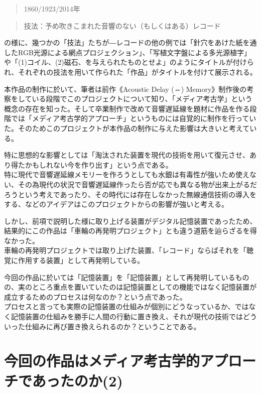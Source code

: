 \documentclass[a4paper,report]{jsbook}
\begin{document}
\begin{quote}
1860/1923/2014年
\end{quote}

\begin{quote}
技法：予め吹きこまれた音響のない（もしくはある）レコード
\end{quote}

の様に、幾つかの「技法」たちが―レコードの他の例では「針穴をあけた紙を通したRGB光源による網点プロジェクション」、「写植文字盤による多光源植字」や「(1)コイル、(2)磁石、を与えられたものとせよ」のようにタイトルが付けられ、それぞれの技法を用いて作られた「作品」がタイトルを付けて展示される。

本作品の制作に於いて、筆者は前作《Acoustic Delay (⇔)
Memory》制作後の考察をしている段階でこのプロジェクトについて知り、「メディア考古学」という概念の存在を知った。そして卒業制作で改めて音響遅延線を題材に作品を作る段階では「メディア考古学的アプローチ」というものには自覚的に制作を行っていた。そのためこのプロジェクトが本作品の制作に与えた影響は大きいと考えている。

特に思想的な影響としては「淘汰された装置を現代の技術を用いて復元させ、あり得たかもしれない今を作り出す」という点である。\\
特に現代で音響遅延線メモリーを作ろうとしても水銀は有毒性が強いため使えない、その為現代の状況で音響遅延線作ったら否が応でも異なる物が出来上がるだろうという考えであったり、その時代には存在しなかった無線通信技術の導入をする、などのアイデアはこのプロジェクトからの影響が強いと考える。

しかし、前項で説明した様に取り上げる装置がデジタル記憶装置であったため、結果的にこの作品は「車輪の再発明プロジェクト」とも違う道筋を辿らざるを得なかった。\\
車輪の再発明プロジェクトでは取り上げた装置、「レコード」ならばそれを「聴覚に作用する装置」として再発明している。

今回の作品に於いては「記憶装置」を「記憶装置」として再発明しているものの、実のところ重点を置いていたのは記憶装置としての機能ではなく記憶装置が成立するためのプロセスは何なのか？という点であった。\\
プロセスと言っても実際の記憶装置の仕組みが個別にどうなっているか、ではなく記憶装置の仕組みを勝手に人間の行動に置き換え、それが現代の技術ではどういった仕組みに再び置き換えられるのか？ということである。

\section{今回の作品はメディア考古学的アプローチであったのか(2)}\label{ux4ecaux56deux306eux4f5cux54c1ux306fux30e1ux30c7ux30a3ux30a2ux8003ux53e4ux5b66ux7684ux30a2ux30d7ux30edux30fcux30c1ux3067ux3042ux3063ux305fux306eux304b2}
\end{document}
